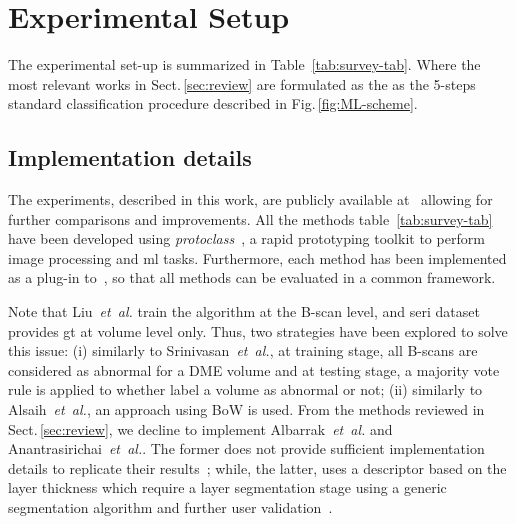 \graphicspath{ {./content/method/figures/} }

\section{Experimental Setup}\label{sec:exp}

The experimental set-up is summarized in Table~\ref{tab:survey-tab}.
Where the most relevant works in Sect.\,\ref{sec:review} are formulated as the as the 5-steps standard classification procedure described in Fig.\,\ref{fig:ML-scheme}.



\subsection{Implementation details}\label{sec:exp:implementation}
The experiments, described in this work, are publicly available at~\cite{rethinopaty20016apr-repoICPR} allowing for further comparisons and improvements.
All the methods table~\ref{tab:survey-tab} have been developed using \emph{protoclass}~\cite{protoclass2016apr-repoICPR}, a rapid prototyping toolkit to perform image processing and \gls{ml} tasks.
Furthermore, each method has been implemented as a plug-in to~\cite{rethinopaty20016apr-repoICPR}, so that all methods can be evaluated in a common framework.

Note that Liu~\emph{et~al.} train the algorithm at the B-scan level, and \gls{seri} dataset provides \gls{gt} at volume level only.
Thus, two strategies have been explored to solve this issue:
(i) similarly to Srinivasan~\emph{et~al.}, at training stage, all B-scans are considered as abnormal for a DME volume and at testing stage, a majority vote rule is applied to whether label a volume as abnormal or not;
(ii) similarly to Alsaih~\emph{et~al.}, an approach using BoW is used.
From the methods reviewed in Sect.\,\ref{sec:review}, we decline to implement Albarrak~\emph{et~al.} and Anantrasirichai~\textit{et~al.}.
The former does not provide sufficient implementation details to replicate their results~\cite{albarrak2013age};
while, the latter, uses a descriptor based on the layer thickness which require a layer segmentation stage using a generic segmentation algorithm and further user validation~\cite{anantrasirichai2013svm}.



